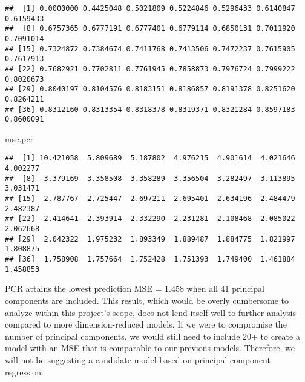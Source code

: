 \documentclass[
]{article}
\newenvironment{Shaded}{\begin{snugshade}}{\end{snugshade}}
\newcommand{\AttributeTok}[1]{\textcolor[rgb]{0.77,0.63,0.00}{#1}}
\newcommand{\FunctionTok}[1]{\textcolor[rgb]{0.00,0.00,0.00}{#1}}
\newcommand{\NormalTok}[1]{#1}
\newcommand{\OtherTok}[1]{\textcolor[rgb]{0.56,0.35,0.01}{#1}}
\newcommand{\SpecialCharTok}[1]{\textcolor[rgb]{0.00,0.00,0.00}{#1}}
\newcommand{\StringTok}[1]{\textcolor[rgb]{0.31,0.60,0.02}{#1}}
\begin{document}
\begin{Shaded}
\end{Shaded}

\begin{verbatim}
##  [1] 0.0000000 0.4425048 0.5021809 0.5224846 0.5296433 0.6140847 0.6159433
##  [8] 0.6757365 0.6777191 0.6777401 0.6779114 0.6850131 0.7011920 0.7091014
## [15] 0.7324872 0.7384674 0.7411768 0.7413506 0.7472237 0.7615905 0.7617913
## [22] 0.7682921 0.7702811 0.7761945 0.7858873 0.7976724 0.7999222 0.8020673
## [29] 0.8040197 0.8104576 0.8183151 0.8186857 0.8191378 0.8251620 0.8264211
## [36] 0.8312160 0.8313354 0.8318378 0.8319371 0.8321284 0.8597183 0.8600091
\end{verbatim}

\begin{Shaded}
\begin{Highlighting}[]
\NormalTok{mse.pcr}
\end{Highlighting}
\end{Shaded}

\begin{verbatim}
##  [1] 10.421058  5.809689  5.187802  4.976215  4.901614  4.021646  4.002277
##  [8]  3.379169  3.358508  3.358289  3.356504  3.282497  3.113895  3.031471
## [15]  2.787767  2.725447  2.697211  2.695401  2.634196  2.484479  2.482387
## [22]  2.414641  2.393914  2.332290  2.231281  2.108468  2.085022  2.062668
## [29]  2.042322  1.975232  1.893349  1.889487  1.884775  1.821997  1.808875
## [36]  1.758908  1.757664  1.752428  1.751393  1.749400  1.461884  1.458853
\end{verbatim}

PCR attains the lowest prediction MSE = 1.458 when all 41 principal
components are included. This result, which would be overly cumbersome
to analyze within this project's scope, does not lend itself well to
further analysis compared to more dimension-reduced models. If we were
to compromise the number of principal components, we would still need to
include 20+ to create a model with an MSE that is comparable to our
previous models. Therefore, we will not be suggesting a candidate model
based on principal component regression.
\end{document}
